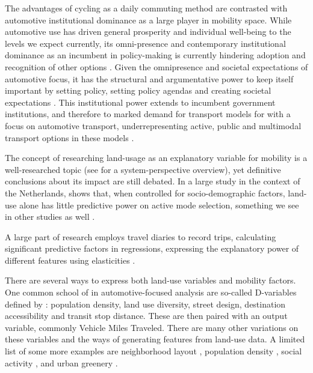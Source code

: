 \documentclass[sigconf, natbib=false, nonacm]{acmart}
\begin{document}
    The advantages of cycling as a daily commuting method are contrasted with automotive institutional dominance as a large player in mobility space. While automotive use has driven general prosperity and individual well-being to the levels we expect currently, its omni-presence and contemporary institutional dominance as an incumbent in policy-making is currently hindering adoption and recognition of other options \parencite{smink_keeping_2015, kanger_user-made_2016}. Given the omnipresence and societal expectations of automotive focus, it has the structural and argumentative power to keep itself important by setting policy, setting policy agendas and creating societal expectations \cite{brisbois_shifting_2020}. This institutional power extends to incumbent government institutions, and therefore to marked demand for transport models for with a focus on automotive transport, underrepresenting active, public and multimodal transport options in these models \parencite{te_brommelstroet_role_2011, keblowski_all_2018}. 
    
    The concept of researching land-usage as an explanatory variable for mobility is a well-researched topic (see \cite{bertolini_planning_2017} for a system-perspective overview), yet definitive conclusions about its impact are still debated. In a large study in the context of the Netherlands, \textcite{snellen_urban_2001} shows that, when controlled for socio-demographic factors, land-use alone has little predictive power on active mode selection, something we see in other studies as well \parencite{nello-deakin_assessing_2019}. 
    
    A large part of research employs travel diaries to record trips, calculating significant predictive factors in regressions, expressing the explanatory power of different features using elasticities \parencite{aditjandra_influence_2013, handy_correlation_2005}. 
    
    There are several ways to express both land-use variables and mobility factors. One common school of in automotive-focused analysis are so-called D-variables defined by \cite{cervero_travel_1997}: population density, land use diversity, street design, destination accessibility and transit stop distance. These are then paired with an output variable, commonly Vehicle Miles Traveled. There are many other variations on these variables and the ways of generating features from land-use data. A limited list of some more examples are neighborhood layout \parencite{hamidi_longitudinal_2014, nello-deakin_assessing_2019, nam_compact_2012, stevens_does_2017}, population density \parencite{gim_meta-analysis_2012, song_comparing_2013}, social activity \parencite{naess_accessibility_2006, bergefurt_loneliness_2019}, and urban greenery \parencite{yang_walk_2021, ewing_streetscape_2016}.
    
\end{document}
